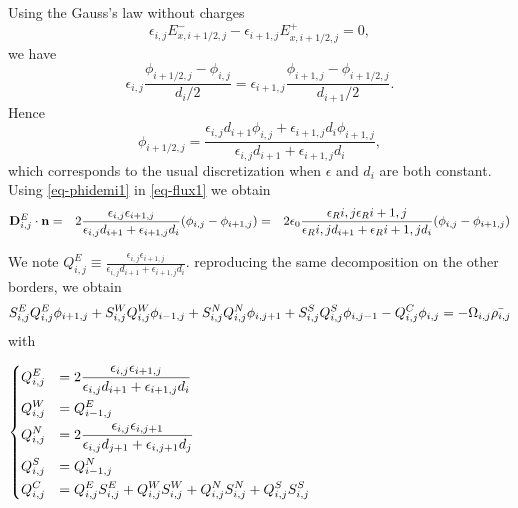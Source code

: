     Using the Gauss's law without charges
    \begin{equation} \label{eq-gausslaw}
      \epsilon_{i,j}E_{x, i+1/2,j}^- - \epsilon_{i+1,j}E_{x, i+1/2,j}^+ =0,
    \end{equation}
    we have
    \begin{equation}
      \epsilon_{i,j} \frac{\phi_{i+1/2,j} - \phi_{i,j}}{d_i/2} = \epsilon_{i+1,j} \frac{\phi_{i+1,j} - \phi_{i+1/2,j}}{d_{i+1}/2}.
    \end{equation}
    Hence
    \begin{equation} \label{eq-phidemi1}
      \phi_{i+1/2,j} = \frac{\epsilon_{i,j} d_{i+1} \phi_{i,j} + \epsilon_{i+1,j} d_{i} \phi_{i+1,j} }{\epsilon_{i,j} d_{i+1} + \epsilon_{i+1,j} d_{i} },
    \end{equation}
    which corresponds to the usual discretization when $\epsilon$ and $d_i$ are both constant.
    Using \cref{eq-phidemi1} in \cref{eq-flux1} we obtain
    \begin{align}
      \label{eq-nosc}
    {\mathbf D}^E_{i,j} \cdot {\mathbf n} &=& 2\frac{\epsilon_{i,j}\epsilon_{i+1,j}}{\epsilon_{i,j}d_{i+1} + \epsilon_{i+1,j} d_i} (\phi_{i,j}-\phi_{i+1,j})
    &=& 2\epsilon_0 \frac{\epsilon_{R}{i,j}\epsilon_{R}{i+1,j}}{\epsilon_{R}{i,j}d_{i+1} + \epsilon_{R}{i+1,j} d_i} (\phi_{i,j}-\phi_{i+1,j})
    \end{align}

    We note $Q^E_{i,j} \equiv \frac{\epsilon_{i,j} \epsilon_{i+1,j}}{\epsilon_{i,j} d_{i+1} + \epsilon_{i+1,j} d_i}$.
    reproducing the same decomposition on the other borders, we obtain
    \begin{equation}
      \label{eq-descretPoisson1}
    S^E_{i,j} Q^E_{i,j} \phi_{i+1,j} + S^W_{i,j} Q^W_{i,j} \phi_{i-1,j} + S^N_{i,j} Q^N_{i,j} \phi_{i,j+1} + S^S_{i,j} Q^S_{i,j} \phi_{i,j-1} - Q^C_{i,j} \phi_{i,j} = - \Omega_{i,j} \bar{\rho_{i,j}}
    \end{equation}
    with
    \begin{center}
      $\begin{dcases}
     Q^E_{i,j} &= 2\frac{\epsilon_{i,j} \epsilon_{i+1,j}}{\epsilon_{i,j} d_{i+1} + \epsilon_{i+1,j} d_i} \\
     Q^W_{i,j} &= Q^E_{i-1,j} \\
     Q^N_{i,j} &= 2\frac{\epsilon_{i,j} \epsilon_{i,j+1}}{\epsilon_{i,j} d_{j+1} + \epsilon_{i,j+1} d_{j}}\\
     Q^S_{i,j} &= Q^N_{i-1,j} \\
     Q^C_{i,j} &= Q^E_{i,j}S^E_{i,j}+Q^W_{i,j}S^W_{i,j}+Q^N_{i,j}S^N_{i,j}+Q^S_{i,j}S^S_{i,j}
     \end{dcases}$
    \end{center}

